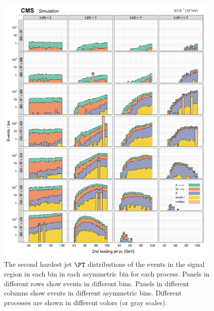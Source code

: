\begin{figure}[!h]
\centering
\includegraphics[scale=0.95]{figures/kiplots/c150107_s150318_f015_jet_pt_1_40}
\caption{The second hardest jet $\PT$ distributions of the events in
the signal region in each \scalht bin in each asymmetric \njet bin for
each process. Panels in different rows show events in different
\scalht bins. Panels in different columns show events in different
asymmetric \njet bins. Different processes are shown in different
colors (or gray scales).} \label{c150107_s150318_f015_jet_pt_1_40}
\end{figure}

